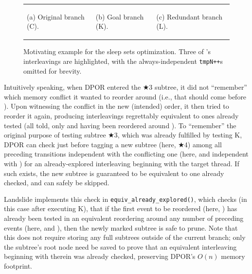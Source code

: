 \begin{figure}[h]
\begin{center}
\begin{tabular}{p{}p{}p{}}
\begin{center}
	(a) Original branch (C).
	\end{center}
	&
	\begin{center}
	(b) Goal branch (K).
	\end{center}
	&
	\begin{center}
	(c) Redundant branch (L).
	\end{center}
	\end{tabular}
	\end{center}
	\caption[Motivating example for the sleep sets optimization.]
		{Motivating example for the sleep sets optimization.
	Three of 's interleavings are highlighted,
	with the always-independent {\tt tmpN++}s omitted for brevity.
	}
	\label{fig:sleepsets}
\end{figure}

Intuitively speaking,
when DPOR entered the $\bigstar$3 subtree,
it did not ``remember'' which memory conflict it wanted to reorder  around
(i.e., that  should come before ).
Upon witnessing the conflict in the new (intended) order,
it then tried to reorder it again,
producing interleavings regrettably equivalent to ones already tested
(all told, only  and  having been reordered around ).
%
To ``remember'' the original purpose of testing subtree $\bigstar$3,
which was already fulfilled by testing K,
DPOR can check just before tagging a new subtree (here, $\bigstar$4)
among all preceding transitions independent with the conflicting one
(here,  and  independent with )
for an already-explored interleaving beginning with the target thread.
If such exists,
the new subtree is guaranteed to be equivalent to one already checked,
and can safely be skipped.

Landslide implements this check in {\tt equiv\_already\_explored()},
which checks (in this case after executing K),
that if the first event to be reordered (here, )
has already been tested in an equivalent reordering around any number of preceding events
(here,  and ),
then the newly marked subtree is safe to prune.
Note that this does not require storing any full subtrees outside of the current branch;
only the subtree's root node need be saved to
prove that an equivalent interleaving beginning with  therein was already checked,
preserving DPOR's $O(n)$ memory footprint.

